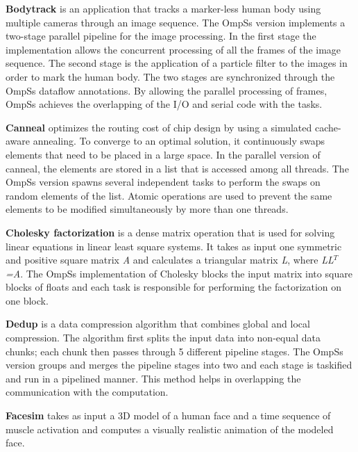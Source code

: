 \textbf{Bodytrack} is an application that tracks a marker-less human body using multiple cameras through an image sequence. 
The OmpSs version implements a two-stage parallel pipeline for the image processing.
In the first stage the implementation allows the concurrent processing of all the frames of the image sequence. 
The second stage is the application of a particle filter to the images in order to mark the human body.
The two stages are synchronized through the OmpSs dataflow annotations.
By allowing the parallel processing of frames, OmpSs achieves the overlapping of the I/O and serial code with the tasks. 

\textbf{Canneal} optimizes the routing cost of chip design by using a simulated cache-aware annealing. 
To converge to an optimal solution, it continuously swaps elements that need to be placed in a large space. 
In the parallel version of canneal, the elements are stored in a list that is accessed among all threads.
The OmpSs version spawns several independent tasks to perform the swaps on random elements of the list.
Atomic operations are used to prevent the same elements to be modified simultaneously by more than one threads.

\textbf{Cholesky factorization} is a dense matrix operation that is used for solving linear equations in linear least square systems.
It takes as input one symmetric and positive square matrix \textit{A} and calculates a triangular matrix \textit{L}, where \textit{LL}$^T$\textit{=A}.
The OmpSs implementation of Cholesky blocks the input matrix into square blocks of floats and each task is responsible for performing the factorization on one block.

\textbf{Dedup} is a data compression algorithm that combines global and local compression. 
The algorithm first splits the input data into non-equal data chunks; each chunk then passes through 5 different pipeline stages. 
The OmpSs version groups and merges the pipeline stages into two and each stage is taskified and run in a pipelined manner.
This method helps in overlapping the communication with the computation.

\textbf{Facesim} takes as input a 3D model of a human face and a time sequence of muscle activation and computes a visually realistic animation of the modeled face. 

